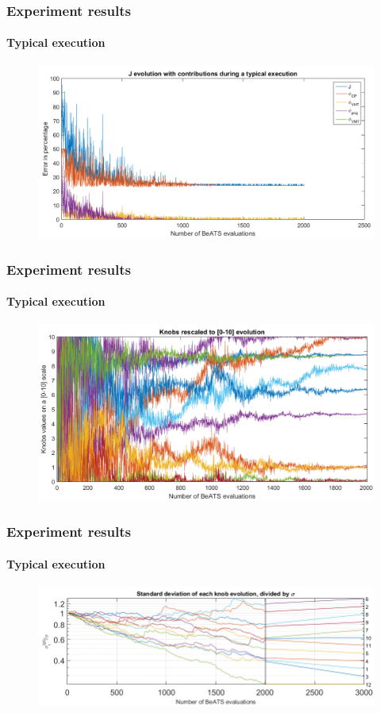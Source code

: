 \documentclass[fleqn]{beamer}
\begin{document}
\begin{frame}
	\frametitle{Experiment results}
	\framesubtitle{Typical execution}
	\begin{figure}
		\centering
		\includegraphics[width=4.5in]{figures/results_figures/contributionsexample.png}
	\end{figure}
\end{frame}

\begin{frame}
	\frametitle{Experiment results}
	\framesubtitle{Typical execution}
	\begin{figure}
		\centering
		\includegraphics[width=4.5in]{figures/results_figures/typicalknobs.png}
	\end{figure}
\end{frame}

\begin{frame}
	\frametitle{Experiment results}
	\framesubtitle{Typical execution}
	\begin{figure}
		\centering
		\includegraphics[width=4.5in]{figures/results_figures/cmaesexample.png}
	\end{figure}
\end{frame}
\end{document}
